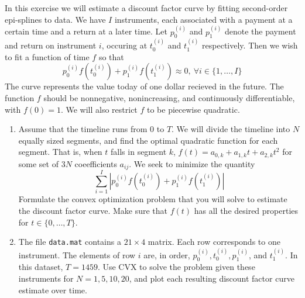 \begin{exercise}\rm
In this exercise we will estimate a discount factor curve by fitting second-order epi-splines to data. We have $I$ instruments, each associated with a payment at a certain time and a return at a later time. Let $p^{(i)}_0$ and $p^{(i)}_1$ denote the payment and return on instrument $i$, occuring at $t^{(i)}_0$ and $t^{(i)}_1$ respectively. Then we wish to fit a function of time $f$ so that
\[
p^{(i)}_0 f(t^{(i)}_0) + p^{(i)}_1 f(t^{(i)}_1) \approx 0,\ \forall i \in \{1,\ldots,I\}
\]
The curve represents the value today of one dollar recieved in the future. The function $f$ should be nonnegative, nonincreasing, and continuously differentiable, with $f(0) = 1$. We will also restrict $f$ to be piecewise quadratic.

\begin{enumerate}
\item Assume that the timeline runs from $0$ to $T$. We will divide the timeline into $N$ equally sized segments, and find the optimal quadratic function for each segment. That is, when $t$ falls in segment $k$, $f(t) = a_{0,k} + a_{1,k}t + a_{2,k}t^2$ for some set of $3N$ coeefficients $a_{ij}$. We seek to minimize the quantity
\[
\sum_{i=1}^I \left| p^{(i)}_0 f(t^{(i)}_0) + p^{(i)}_1 f(t^{(i)}_1) \right|
\]
Formulate the convex optimization problem that you will solve to estimate the discount factor curve. Make sure that $f(t)$ has all the desired properties for $t \in \{0,\ldots,T\}$.

\item The file \texttt{data.mat} contains a $21 \times 4$ matrix. Each row corresponds to one instrument. The elements of row $i$ are, in order, $p^{(i)}_0,t^{(i)}_0,p^{(i)}_1$, and $t^{(i)}_1$. In this dataset, $T = 1459$. Use CVX to solve the problem given these instruments for $N = 1, 5, 10, 20$, and plot each resulting discount factor curve estimate over time.
\end{enumerate}
\end{exercise}
